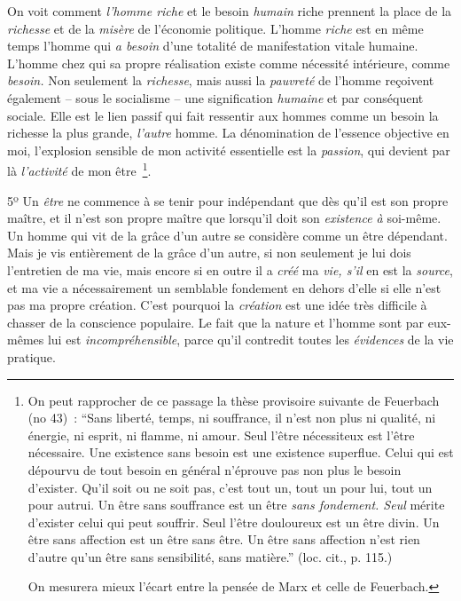 \documentclass[french,twoside]{book} %
\begin{document}
On voit comment \emph{l’homme riche} et le besoin \emph{humain} riche prennent la place de la \emph{richesse} et de la \emph{misère} de l’économie politique. L’homme \emph{riche} est en même temps l’homme qui \emph{a besoin} d’une totalité de manifestation vitale humaine. L’homme chez qui sa propre réalisation existe comme nécessité intérieure, comme \emph{besoin.} Non seulement la \emph{richesse}, mais aussi la \emph{pauvreté} de l’homme reçoivent également – sous le socialisme – une signification \emph{humaine} et par conséquent sociale. Elle est le lien passif qui fait ressentir aux hommes comme un besoin la richesse la plus grande, \emph{l’autre} homme. La dénomination de l’essence objective en moi, l’explosion sensible de mon activité essentielle est la \emph{passion}, qui devient par là \emph{l’activité} de mon être \footnote{ \noindent On peut rapprocher de ce passage la thèse provisoire suivante de Feuerbach (no 43) : “Sans liberté, temps, ni souffrance, il n’est non plus ni qualité, ni énergie, ni esprit, ni flamme, ni amour. Seul l’être nécessiteux est l’être nécessaire. Une existence sans besoin est une existence superflue. Celui qui est dépourvu de tout besoin en général n’éprouve pas non plus le besoin d’exister. Qu’il soit ou ne soit pas, c’est tout un, tout un pour lui, tout un pour autrui. Un être sans souffrance est un être \emph{sans fondement. Seul} mérite d’exister celui qui peut souffrir. Seul l’être douloureux est un être divin. Un être sans affection est un être sans être. Un être sans affection n’est rien d’autre qu’un être sans sensibilité, sans matière.” (loc. cit., p. 115.)\par
 On mesurera mieux l’écart entre la pensée de Marx et celle de Feuerbach.
}.\par
5º Un \emph{être} ne commence à se tenir pour indépendant que dès qu’il est son propre maître, et il n’est son propre maître que lorsqu’il doit son \emph{existence à} soi-même. Un homme qui vit de la grâce d’un autre se considère comme un être dépendant. Mais je vis entièrement de la grâce d’un autre, si non seulement je lui dois l’entretien de ma vie, mais encore si en outre il a \emph{créé} ma \emph{vie, s’il} en est la \emph{source}, et ma vie a nécessairement un semblable fondement en dehors d’elle si elle n’est pas ma propre création. C’est pourquoi la \emph{création} est une idée très difficile à chasser de la conscience populaire. Le fait que la nature et l’homme sont par eux-mêmes lui est \emph{incompréhensible}, parce qu’il contredit toutes les \emph{évidences} de la vie pratique.\par
\end{document}
